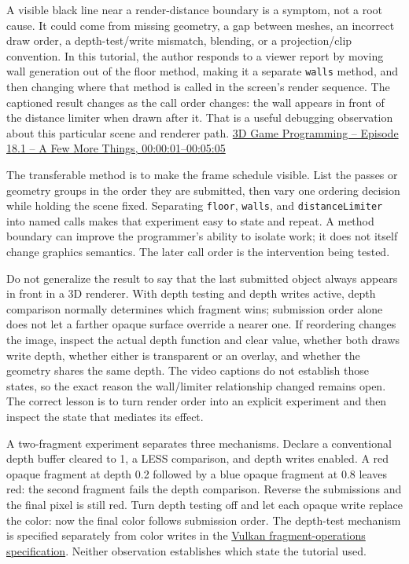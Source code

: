 A visible black line near a render-distance boundary is a symptom, not a root cause. It could come from missing geometry, a gap between meshes, an incorrect draw order, a depth-test/write mismatch, blending, or a projection/clip convention. In this tutorial, the author responds to a viewer report by moving wall generation out of the floor method, making it a separate \texttt{walls} method, and then changing where that method is called in the screen's render sequence. The captioned result changes as the call order changes: the wall appears in front of the distance limiter when drawn after it. That is a useful debugging observation about this particular scene and renderer path. \href{https://www.youtube.com/watch?v=98K5Bm2sApY&t=1s}{3D Game Programming -- Episode 18.1 -- A Few More Things, 00:00:01--00:05:05}

The transferable method is to make the frame schedule visible. List the passes or geometry groups in the order they are submitted, then vary one ordering decision while holding the scene fixed. Separating \texttt{floor}, \texttt{walls}, and \texttt{distanceLimiter} into named calls makes that experiment easy to state and repeat. A method boundary can improve the programmer's ability to isolate work; it does not itself change graphics semantics. The later call order is the intervention being tested.

Do not generalize the result to say that the last submitted object always appears in front in a 3D renderer. With depth testing and depth writes active, depth comparison normally determines which fragment wins; submission order alone does not let a farther opaque surface override a nearer one. If reordering changes the image, inspect the actual depth function and clear value, whether both draws write depth, whether either is transparent or an overlay, and whether the geometry shares the same depth. The video captions do not establish those states, so the exact reason the wall/limiter relationship changed remains open. The correct lesson is to turn render order into an explicit experiment and then inspect the state that mediates its effect.

A two-fragment experiment separates three mechanisms. Declare a conventional depth buffer cleared to 1, a LESS comparison, and depth writes enabled. A red opaque fragment at depth 0.2 followed by a blue opaque fragment at 0.8 leaves red: the second fragment fails the depth comparison. Reverse the submissions and the final pixel is still red. Turn depth testing off and let each opaque write replace the color: now the final color follows submission order. The depth-test mechanism is specified separately from color writes in the \href{https://docs.vulkan.org/spec/latest/chapters/fragops.html\#fragops-depth}{Vulkan fragment-operations specification}. Neither observation establishes which state the tutorial used.

